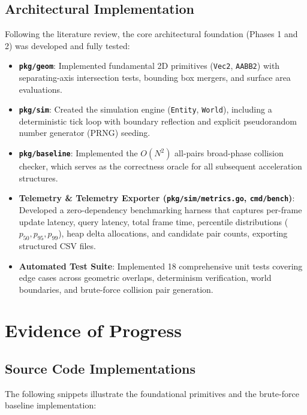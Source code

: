 \documentclass[12pt]{article}
\begin{document}
\subsection{Architectural Implementation}

Following the literature review, the core architectural foundation (Phases 1 and 2) was developed and fully tested:

\begin{itemize}
    \item \textbf{\texttt{pkg/geom}}: Implemented fundamental 2D primitives (\texttt{Vec2}, \texttt{AABB2}) with separating-axis intersection tests, bounding box mergers, and surface area evaluations.
    \item \textbf{\texttt{pkg/sim}}: Created the simulation engine (\texttt{Entity}, \texttt{World}), including a deterministic tick loop with boundary reflection and explicit pseudorandom number generator (PRNG) seeding.
    \item \textbf{\texttt{pkg/baseline}}: Implemented the $O(N^2)$ all-pairs broad-phase collision checker, which serves as the correctness oracle for all subsequent acceleration structures.
    \item \textbf{Telemetry \& Telemetry Exporter (\texttt{pkg/sim/metrics.go}, \texttt{cmd/bench})}: Developed a zero-dependency benchmarking harness that captures per-frame update latency, query latency, total frame time, percentile distributions ($p_{50}, p_{95}, p_{99}$), heap delta allocations, and candidate pair counts, exporting structured CSV files.
    \item \textbf{Automated Test Suite}: Implemented 18 comprehensive unit tests covering edge cases across geometric overlaps, determinism verification, world boundaries, and brute-force collision pair generation.
\end{itemize}

\section{Evidence of Progress}

\subsection{Source Code Implementations}

The following snippets illustrate the foundational primitives and the brute-force baseline implementation:
\end{document}
